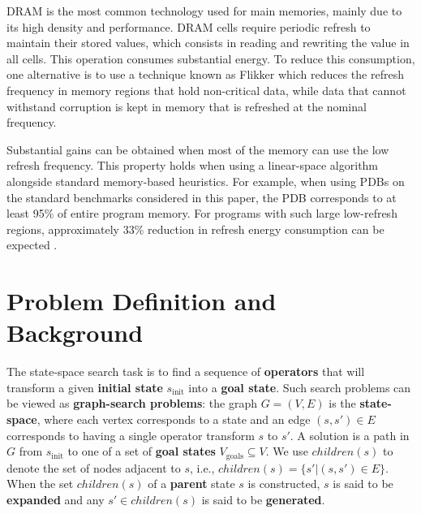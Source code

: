 \documentclass[letterpaper]{article}
\begin{document}
DRAM is the most common technology used for main memories, mainly due to its high density and performance. DRAM cells require periodic refresh to maintain their stored values, which consists in reading and rewriting the value in all cells. This operation consumes substantial energy. To reduce this consumption, one alternative is to use a technique known as Flikker \cite{Liu:2011:FSD:1950365.1950391} which reduces the refresh frequency in memory regions that hold non-critical data, %
while data that cannot withstand corruption is kept in memory that is refreshed at the nominal frequency. %

Substantial gains can be obtained when most of the memory can use the low refresh frequency. This property holds when using a linear-space algorithm alongside standard memory-based heuristics. For example, when using PDBs on the standard benchmarks considered in this paper, the PDB corresponds to at least 95\% of entire program memory. For programs with such large low-refresh regions, approximately 33\% reduction in refresh energy consumption can be expected \cite{Liu:2011:FSD:1950365.1950391}.


\section{Problem Definition and Background}





The state-space search task is to find a sequence of \textbf{operators} that will transform  a given \textbf{initial state} $s_{\mathrm{init}}$ into a \textbf{goal state}. Such search problems can be viewed as \textbf{graph-search problems}: the graph $G = (V, E)$ is the \textbf{state-space}, where each vertex corresponds to a state and an edge $(s,s')\in E$ corresponds to having a single operator transform $s$ to $s'$.
A solution is a path in $G$ from $s_{\mathrm{init}}$ to one of a set of \textbf{goal states} $V_{\mathrm{goals}}\subseteq V$. We use $children(s)$ to denote the set of nodes adjacent to $s$, i.e., $children(s) = \{ s' | (s,s') \in E\}$.  When the
set $children(s)$ of a \textbf{parent} state $s$ is constructed, $s$ is said to be \textbf{expanded} and any $s'\in children(s)$ is said to be \textbf{generated}.
\end{document}
